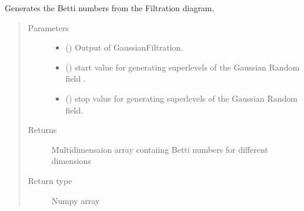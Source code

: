 \documentclass[letterpaper,10pt,english]{sphinxmanual}
\begin{document}

\begin{fulllineitems}
\label{\detokenize{topologicalFunc:topologicalFunc.GenerateBettiP}}
\sphinxAtStartPar
Generates the Betti numbers from the Filtration diagram.
\begin{quote}\begin{description}
\item[{Parameters}] \leavevmode\begin{itemize}
\item {} 
\sphinxAtStartPar
{} () \textendash{} Output of GaussianFiltration.

\item {} 
\sphinxAtStartPar
{} () \textendash{} start value for generating superlevels of the Gaussian Random field .

\item {} 
\sphinxAtStartPar
{} () \textendash{} stop value for generating superlevels of the Gaussian Random field.

\end{itemize}

\item[{Returns}] \leavevmode
\sphinxAtStartPar
Multidimensaion array contaiing Betti numbers for different dimensions

\item[{Return type}] \leavevmode
\sphinxAtStartPar
Numpy array

\end{description}\end{quote}

\end{fulllineitems}

\end{document}
